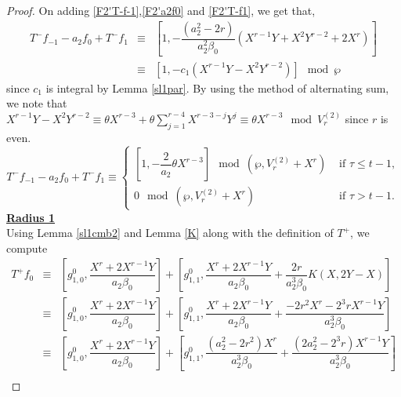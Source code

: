 \documentclass[11pt, reqno]{amsart}
\numberwithin{equation}{section}
\theoremstyle{definition}
\theoremstyle{remark}
\theoremstyle{definition}
\theoremstyle{remark}
\theoremstyle{remark}
\begin{document}
\begin{proof}
 
 On adding \eqref{F2'T-f-1},\eqref{F2'a2f0} and \eqref{F2'T-f1}, we get that,
 \begin{eqnarray}
T^{-}f_{-1}-a_{2}f_{0}+T^{-}f_{1} &\equiv& \left[1, -\dfrac{(a_{2}^2-2r)}{a_{2}^2\beta_{0}}(X^{r-1}Y+X^2Y^{r-2}+2X^r)\right] \nonumber\\
&\equiv& \left[1, -c_{1}(X^{r-1}Y-X^2Y^{r-2})\right]\mod\wp \nonumber
\end{eqnarray}
 since $c_{1}$ is integral by Lemma \ref{sl1par}.  
By using the method of alternating sum, we note that $X^{r-1}Y-X^{2}Y^{r-2} \equiv \theta X^{r-3} + \theta \displaystyle\sum_{j=1}^{r-4}X^{r-3-j}Y^{j} \equiv \theta X^{r-3} \mod V_{r}^{(2)}$ since $r$ is even. 
\begin{equation}\label{sl1F2'rad0}
T^{-}f_{-1}-a_{2}f_{0}+T^{-}f_{1} \equiv \begin{cases} 
\left[   1, -\dfrac{2}{a_{2}}\theta X^{r-3}\right] \mod(\wp, V_{r}^{(2)}+X^{r}) & \text{ if }\tau\leq t-1,\\
0 \mod(\wp, V_{r}^{(2)}+X^{r}) & \text{ if } \tau>t-1. 
\end{cases}
\end{equation}
\noindent\underline{\textbf{Radius 1}}\\
Using Lemma \ref{sl1cmb2} and Lemma \ref{K} along with the definition of $T^+$, we compute
\begin{eqnarray}\label{F2'T+f0}
    T^{+}f_{0} &\equiv& \left[g_{1,0}^{0}, \dfrac{X^{r}+ 2X^{r-1}Y}{a_{2}\beta_{0}}\right] + \left[g_{1,1}^{0}, \dfrac{X^{r}+2X^{r-1}Y}{a_{2}\beta_{0}}+\dfrac{2r}{a_{2}^{3}\beta_{0}}K(X,2Y-X) \right] \nonumber\\
    &\equiv& \left[g_{1,0}^{0},\dfrac{X^{r}+ 2X^{r-1}Y}{a_{2}\beta_{0}}\right]+ \left[g_{1,1}^{0}, \dfrac{X^{r}+ 2X^{r-1}Y}{a_{2}\beta_{0}} + \dfrac{-2r^2X^{r}-2^3rX^{r-1}Y}{a_{2}^3\beta_{0}}   \right] \nonumber\\
    &\equiv& \left[g_{1,0}^{0},\dfrac{X^{r}+ 2X^{r-1}Y}{a_{2}\beta_{0}}\right]+ \left[g_{1,1}^{0}, \dfrac{(a_{2}^2-2r^2)X^{r}}{a_{2}^3\beta_{0}} + \dfrac{(2a_{2}^2-2^3r)X^{r-1}Y}{a_{2}^3\beta_{0}}   \right] \nonumber\\

\end{eqnarray}
\end{proof}
\end{document}
